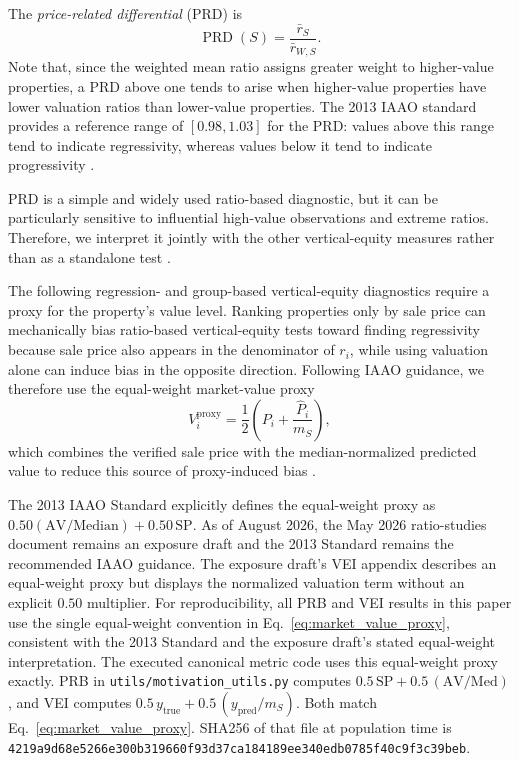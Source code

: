 \documentclass[10pt]{article}
\theoremstyle{definition}
\newcommand{\1}{\mathbf{1}}
\newcommand{\newtext}[1]{\textcolor{impGreen}{#1}}
\newcommand{\latesttext}[1]{\textcolor{latestPurple}{#1}}
\begin{document}
The \emph{price-related differential} (PRD) is
\begin{equation}
\label{eq:prd}
\operatorname{PRD}(S)
=
\frac{\bar r_S}{\bar r_{W,S}}.
\end{equation}
Note that, since the weighted mean ratio assigns greater weight to higher-value properties, a PRD above one tends to arise when higher-value properties have lower valuation ratios than lower-value properties. The 2013 IAAO standard provides a reference range of $[0.98,1.03]$ for the PRD: values above this range tend to indicate regressivity, whereas values below it tend to indicate progressivity \cite{IAAO2013Ratio}.

{PRD is a simple and widely used ratio-based diagnostic, but it can be particularly sensitive to influential high-value observations and extreme ratios. Therefore, we interpret it jointly with the other vertical-equity measures rather than as a standalone test \cite{IAAO2026ExposureRatio}.}


{The following regression- and group-based vertical-equity diagnostics require a proxy for the property's value level. Ranking properties only by sale price can mechanically bias ratio-based vertical-equity tests toward finding regressivity because sale price also appears in the denominator of $r_i$, while using valuation alone can induce bias in the opposite direction. Following IAAO guidance, we therefore use the equal-weight market-value proxy}
\begin{equation}
\label{eq:market_value_proxy}
V_i^{\mathrm{proxy}}
=
\frac{1}{2}
\left(
P_i+\frac{\widehat P_i}{m_S}
\right),
\end{equation}
{which combines the verified sale price with the median-normalized predicted value to reduce this source of proxy-induced bias \cite{IAAO2013Ratio,IAAO2026ExposureRatio}.}

\newtext{The 2013 IAAO Standard explicitly defines the equal-weight proxy as $0.50(\mathrm{AV}/\mathrm{Median})+0.50\,\mathrm{SP}$. As of August 2026, the May 2026 ratio-studies document remains an exposure draft and the 2013 Standard remains the recommended IAAO guidance. The exposure draft's VEI appendix describes an equal-weight proxy but displays the normalized valuation term without an explicit $0.50$ multiplier. For reproducibility, all PRB and VEI results in this paper use the single equal-weight convention in Eq.~\eqref{eq:market_value_proxy}, consistent with the 2013 Standard and the exposure draft's stated equal-weight interpretation.}
\latesttext{The executed canonical metric code uses this equal-weight proxy exactly. PRB in \texttt{utils/motivation\_utils.py} computes $0.5\,\mathrm{SP}+0.5\,(\mathrm{AV}/\mathrm{Med})$, and VEI computes $0.5\,y_{\mathrm{true}}+0.5\,(y_{\mathrm{pred}}/m_S)$. Both match Eq.~\eqref{eq:market_value_proxy}. SHA256 of that file at population time is \texttt{4219a9d68e5266e300b319660f93d37ca184189ee340edb0785f40c9f3c39beb}.}
\end{document}
